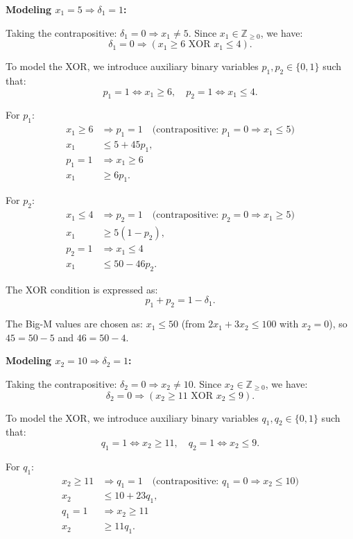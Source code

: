 \documentclass{article}
\begin{document}
\begin{enumerate}
\textbf{Modeling $x_1 = 5 \Rightarrow \delta_1 = 1$:}

Taking the contrapositive: $\delta_1 = 0 \Rightarrow x_1 \neq 5$. Since $x_1 \in \mathbb{Z}_{\geq 0}$, we have:
\[
\delta_1 = 0 \Rightarrow (x_1 \geq 6 \text{ XOR } x_1 \leq 4).
\]

To model the XOR, we introduce auxiliary binary variables $p_1, p_2 \in \{0,1\}$ such that:
\[
p_1 = 1 \Leftrightarrow x_1 \geq 6, \quad p_2 = 1 \Leftrightarrow x_1 \leq 4.
\]

For $p_1$:
\begin{align*}
x_1 \geq 6 &\Rightarrow p_1 = 1 \quad \text{(contrapositive: } p_1 = 0 \Rightarrow x_1 \leq 5\text{)} \\
x_1 &\leq 5 + 45p_1, \\
p_1 = 1 &\Rightarrow x_1 \geq 6 \\
x_1 &\geq 6p_1.
\end{align*}

For $p_2$:
\begin{align*}
x_1 \leq 4 &\Rightarrow p_2 = 1 \quad \text{(contrapositive: } p_2 = 0 \Rightarrow x_1 \geq 5\text{)} \\
x_1 &\geq 5(1-p_2), \\
p_2 = 1 &\Rightarrow x_1 \leq 4 \\
x_1 &\leq 50 - 46p_2.
\end{align*}

The XOR condition is expressed as:
\[
p_1 + p_2 = 1 - \delta_1.
\]

The Big-M values are chosen as: $x_1 \leq 50$ (from $2x_1 + 3x_2 \leq 100$ with $x_2 = 0$), so $45 = 50 - 5$ and $46 = 50 - 4$.

\textbf{Modeling $x_2 = 10 \Rightarrow \delta_2 = 1$:}

Taking the contrapositive: $\delta_2 = 0 \Rightarrow x_2 \neq 10$. Since $x_2 \in \mathbb{Z}_{\geq 0}$, we have:
\[
\delta_2 = 0 \Rightarrow (x_2 \geq 11 \text{ XOR } x_2 \leq 9).
\]

To model the XOR, we introduce auxiliary binary variables $q_1, q_2 \in \{0,1\}$ such that:
\[
q_1 = 1 \Leftrightarrow x_2 \geq 11, \quad q_2 = 1 \Leftrightarrow x_2 \leq 9.
\]

For $q_1$:
\begin{align*}
x_2 \geq 11 &\Rightarrow q_1 = 1 \quad \text{(contrapositive: } q_1 = 0 \Rightarrow x_2 \leq 10\text{)} \\
x_2 &\leq 10 + 23q_1, \\
q_1 = 1 &\Rightarrow x_2 \geq 11 \\
x_2 &\geq 11q_1.
\end{align*}


\end{enumerate}
\end{document}
